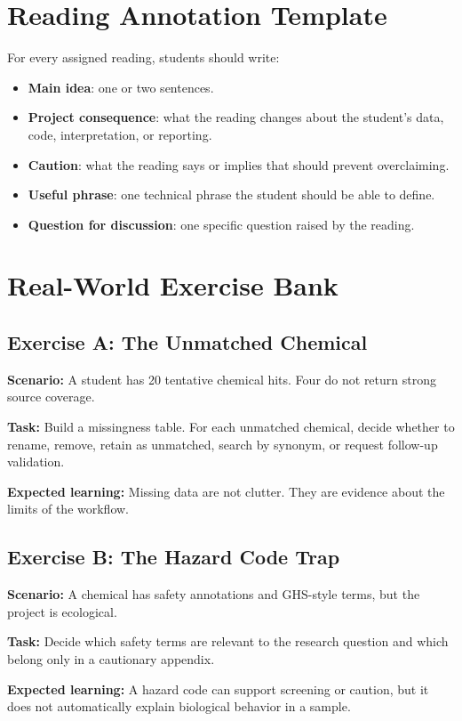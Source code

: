 \section{Reading Annotation Template}
For every assigned reading, students should write:
\begin{itemize}
  \item \textbf{Main idea}: one or two sentences.
  \item \textbf{Project consequence}: what the reading changes about the student's data, code, interpretation, or reporting.
  \item \textbf{Caution}: what the reading says or implies that should prevent overclaiming.
  \item \textbf{Useful phrase}: one technical phrase the student should be able to define.
  \item \textbf{Question for discussion}: one specific question raised by the reading.
\end{itemize}

\section{Real-World Exercise Bank}
\subsection{Exercise A: The Unmatched Chemical}
\textbf{Scenario:} A student has 20 tentative chemical hits. Four do not return strong source coverage.

\textbf{Task:} Build a missingness table. For each unmatched chemical, decide whether to rename, remove, retain as unmatched, search by synonym, or request follow-up validation.

\textbf{Expected learning:} Missing data are not clutter. They are evidence about the limits of the workflow.

\subsection{Exercise B: The Hazard Code Trap}
\textbf{Scenario:} A chemical has safety annotations and GHS-style terms, but the project is ecological.

\textbf{Task:} Decide which safety terms are relevant to the research question and which belong only in a cautionary appendix.

\textbf{Expected learning:} A hazard code can support screening or caution, but it does not automatically explain biological behavior in a sample.

